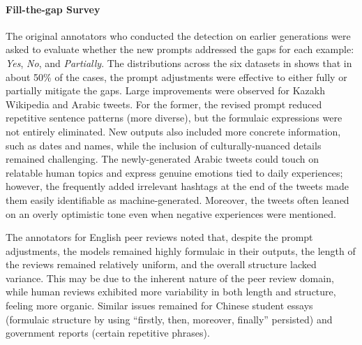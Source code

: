 


\paragraph{Fill-the-gap Survey}
The original annotators who conducted the detection on earlier generations were asked to evaluate whether the new prompts addressed the gaps for each example: \emph{Yes}, \emph{No}, and \emph{Partially}.
The distributions across the six datasets in  shows that in about 50\% of the cases, the prompt adjustments were effective to  either fully or partially mitigate the gaps. Large improvements were observed for Kazakh Wikipedia and Arabic tweets.
For the former, the revised prompt reduced repetitive sentence patterns (more diverse), but the formulaic expressions were not entirely eliminated. New outputs also included more concrete information, such as dates and names, while the inclusion of culturally-nuanced details remained challenging. The newly-generated Arabic tweets could touch on relatable human topics and express genuine emotions tied to daily experiences; however, the frequently added irrelevant hashtags at the end of the tweets made them easily identifiable as machine-generated. Moreover, the tweets often leaned on an overly optimistic tone even when negative experiences were mentioned. 

The annotators for English peer reviews noted that, despite the prompt adjustments, the models remained highly formulaic in their outputs, the length of the reviews remained relatively uniform, and the overall structure lacked variance. This may be due to the inherent nature of the peer review domain, while human reviews exhibited more variability in both length and structure, feeling more organic.
Similar issues remained for Chinese student essays (formulaic structure by using ``firstly, then, moreover, finally'' persisted) and government reports (certain repetitive phrases). 


